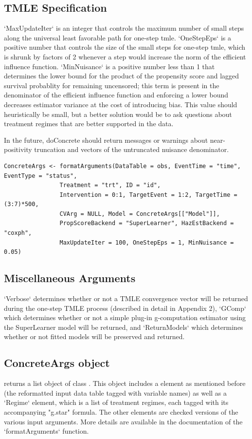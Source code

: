 \documentclass{report}
\newcommand{\1}{\ensuremath{\mathbf{1}}}
\begin{document}
\begin{enumerate}
\subsection{TMLE Specification}
`MaxUpdateIter` is an integer that controls the maximum number of small steps along the universal least favorable path for one-step tmle. `OneStepEps` is a positive number that controls the size of the small steps for one-step tmle, which is shrunk by factors of 2 whenever a step would increase the norm of the efficient influence function. `MinNuisance` is a positive number less than 1 that determines the lower bound for the product of the propensity score and lagged survival probablity for remaining uncensored; this term is present in the denominator of the efficient influence function and enforcing a lower bound decreases estimator variance at the cost of introducing bias. This value should heuristically be small, but a better solution would be to ask questions about treatment regimes that are better supported in the data.

In the future, doConcrete should return messages or warnings about near-positivity truncation and vectors of the untruncated nuisance denominator.

\begin{lstlisting}
ConcreteArgs <- formatArguments(DataTable = obs, EventTime = "time", EventType = "status", 
				Treatment = "trt", ID = "id", 
				Intervention = 0:1, TargetEvent = 1:2, TargetTime = (3:7)*500, 
				CVArg = NULL, Model = ConcreteArgs[["Model"]], 
				PropScoreBackend = "SuperLearner", HazEstBackend = "coxph", 
				MaxUpdateIter = 100, OneStepEps = 1, MinNuisance = 0.05)
\end{lstlisting}

\subsection{Miscellaneous Arguments}
`Verbose` determines whether or not a TMLE convergence vector will be returned during the one-step TMLE process (described in detail in Appendix 2), `GComp` which determines whether or not a simple plug-in g-computation estimator using the SuperLearner model will be returned, and `ReturnModels` which determines whether or not fitted models will be preserved and returned.

\subsection{ConcreteArgs object}
 returns a list object of class . This object includes a  element as mentioned before (the reformatted input data table tagged with variable names) as well as a `Regime` element, which is a list of treatment regimes, each tagged with its accompanying "g.star" formula. The other elements are checked versions of the various input arguments. More details are available in the documentation of the `formatArguments` function.


\end{enumerate}
\end{document}

